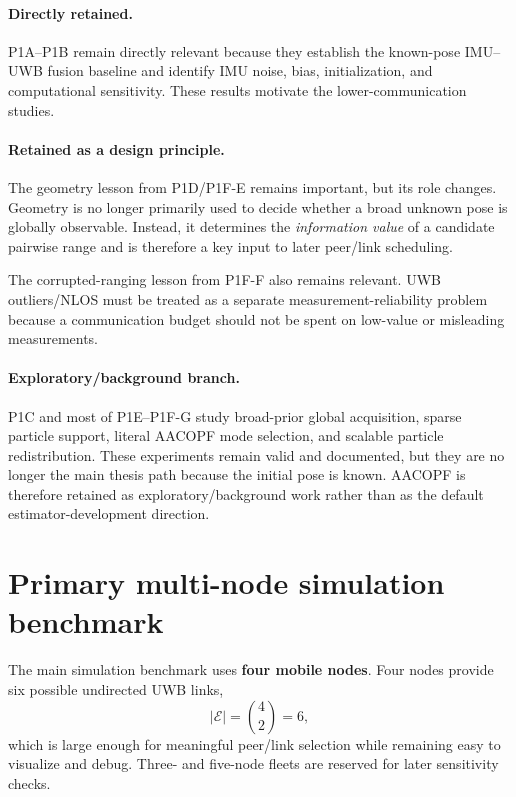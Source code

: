 \paragraph{Directly retained.}
P1A--P1B remain directly relevant because they establish the known-pose IMU--UWB fusion baseline and identify IMU noise, bias, initialization, and computational sensitivity. These results motivate the lower-communication studies.

\paragraph{Retained as a design principle.}
The geometry lesson from P1D/P1F-E remains important, but its role changes. Geometry is no longer primarily used to decide whether a broad unknown pose is globally observable. Instead, it determines the \emph{information value} of a candidate pairwise range and is therefore a key input to later peer/link scheduling.

The corrupted-ranging lesson from P1F-F also remains relevant. UWB outliers/NLOS must be treated as a separate measurement-reliability problem because a communication budget should not be spent on low-value or misleading measurements.

\paragraph{Exploratory/background branch.}
P1C and most of P1E--P1F-G study broad-prior global acquisition, sparse particle support, literal AACOPF mode selection, and scalable particle redistribution. These experiments remain valid and documented, but they are no longer the main thesis path because the initial pose is known. AACOPF is therefore retained as exploratory/background work rather than as the default estimator-development direction.

\section{Primary multi-node simulation benchmark}
The main simulation benchmark uses \textbf{four mobile nodes}. Four nodes provide six possible undirected UWB links,
\begin{equation}
    |\mathcal{E}|=\binom{4}{2}=6,
\end{equation}
which is large enough for meaningful peer/link selection while remaining easy to visualize and debug. Three- and five-node fleets are reserved for later sensitivity checks.

